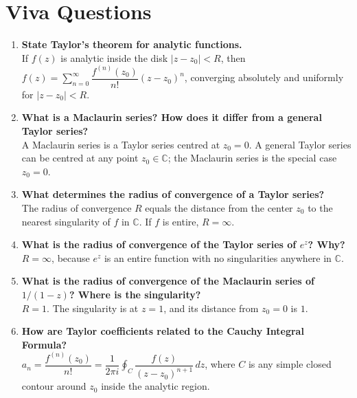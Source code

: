 \documentclass[12pt,a4paper]{article}
\begin{document}
\section{Viva Questions}

\begin{enumerate}[label=\textbf{Q\arabic*.}, leftmargin=*, noitemsep]

\item \textbf{State Taylor's theorem for analytic functions.}\\
If $f(z)$ is analytic inside the disk $|z-z_0|<R$, then $f(z) = \sum_{n=0}^{\infty}\dfrac{f^{(n)}(z_0)}{n!}(z-z_0)^n$, converging absolutely and uniformly for $|z-z_0|<R$.

\item \textbf{What is a Maclaurin series? How does it differ from a general Taylor series?}\\
A Maclaurin series is a Taylor series centred at $z_0=0$. A general Taylor series can be centred at any point $z_0\in\mathbb{C}$; the Maclaurin series is the special case $z_0=0$.

\item \textbf{What determines the radius of convergence of a Taylor series?}\\
The radius of convergence $R$ equals the distance from the center $z_0$ to the nearest singularity of $f$ in $\mathbb{C}$. If $f$ is entire, $R=\infty$.

\item \textbf{What is the radius of convergence of the Taylor series of $e^z$? Why?}\\
$R = \infty$, because $e^z$ is an entire function with no singularities anywhere in $\mathbb{C}$.

\item \textbf{What is the radius of convergence of the Maclaurin series of $1/(1-z)$? Where is the singularity?}\\
$R = 1$. The singularity is at $z = 1$, and its distance from $z_0=0$ is $1$.

\item \textbf{How are Taylor coefficients related to the Cauchy Integral Formula?}\\
$a_n = \dfrac{f^{(n)}(z_0)}{n!} = \dfrac{1}{2\pi i}\oint_{C}\dfrac{f(z)}{(z-z_0)^{n+1}}\,dz$, where $C$ is any simple closed contour around $z_0$ inside the analytic region.


\end{enumerate}
\end{document}
